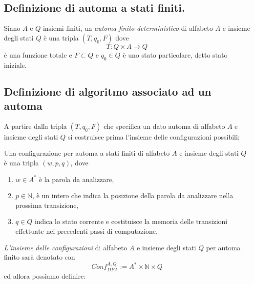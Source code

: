 \subsection{Definizione di automa a stati finiti.}

\begin{defi}\label{def:1}
Siano $A$ e $Q$ insiemi finiti, un \textit{automa finito deterministico} di alfabeto $A$ e insieme degli stati $Q$  è una tripla $(T,q_0,F)$ dove
\[
T: Q\times A \to Q
\]
è una funzione totale e
$F \subset Q$ e $q_0\in Q$ è uno stato particolare, detto stato iniziale.
\end{defi}


\subsection{Definizione di algoritmo associato ad un automa}

A partire dalla tripla $(T,q_0,F)$ 
che specifica un dato automa di alfabeto 
$A$ e insieme degli stati $Q$ si costruisce prima l'insieme delle configurazioni possibili:

\begin{defi}\label{def:3}
Una configurazione per automa a stati finiti di alfabeto $A$ e insieme degli stati $Q$ è una tripla $(w,p,q)$, dove
\begin{enumerate}
    \item $w\in A^*$ è la parola da analizzare,
    \item $p\in\mathbb{N}$, è un intero che indica la posizione della parola da analizzare nella prossima transizione,
    \item $q\in Q$ indica lo stato corrente e costituisce la memoria delle transizioni effettuate nei precedenti passi di computazione.
\end{enumerate}
\end{defi}

\textit{L'insieme delle configurazioni} di alfabeto $A$ e insieme degli stati $Q$ per automa finito sarà denotato con
\[
Conf_{DFA}^{A,Q} := A^* \times \mathbb{N} \times Q
\]
ed allora possiamo definire:


